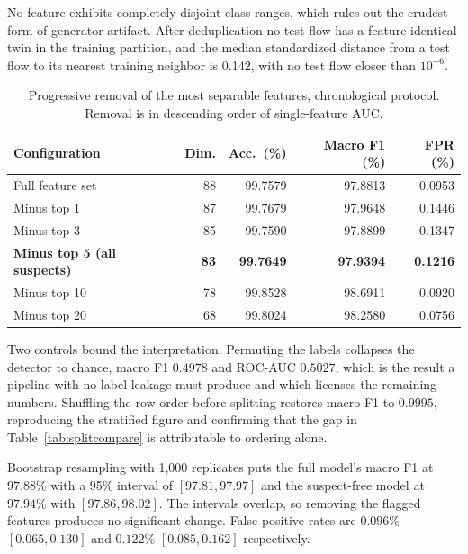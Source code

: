 \documentclass{ieeeaccess}
\begin{document}
No feature exhibits completely disjoint class ranges, which rules out the crudest form of generator artifact. After deduplication no test flow has a feature-identical twin in the training partition, and the median standardized distance from a test flow to its nearest training neighbor is 0.142, with no test flow closer than $10^{-6}$.

\begin{table}[!t]
\caption{Progressive removal of the most separable features, chronological protocol. Removal is in descending order of single-feature AUC.}
\centering
\label{tab:removal}
\footnotesize
\setlength{\tabcolsep}{4pt}
\renewcommand{\arraystretch}{1.2}
\begin{tabular}{@{}lrrrr@{}}
\toprule
\textbf{Configuration} & \textbf{Dim.} & \textbf{Acc.\ (\%)} & \textbf{Macro F1 (\%)} & \textbf{FPR (\%)} \\
\midrule
Full feature set        & 88 & 99.7579 & 97.8813 & 0.0953 \\
Minus top 1             & 87 & 99.7679 & 97.9648 & 0.1446 \\
Minus top 3             & 85 & 99.7590 & 97.8899 & 0.1347 \\
\textbf{Minus top 5 (all suspects)} & \textbf{83} & \textbf{99.7649} & \textbf{97.9394} & \textbf{0.1216} \\
Minus top 10            & 78 & 99.8528 & 98.6911 & 0.0920 \\
Minus top 20            & 68 & 99.8024 & 98.2580 & 0.0756 \\
\bottomrule
\end{tabular}
\end{table}

Two controls bound the interpretation. Permuting the labels collapses the
detector to chance, macro F1 $0.4978$ and ROC-AUC $0.5027$, which is the result a
pipeline with no label leakage must produce and which licenses the remaining
numbers. Shuffling the row order before splitting restores macro F1 to
$0.9995$, reproducing the stratified figure and confirming that the gap in
Table~\ref{tab:splitcompare} is attributable to ordering alone.

Bootstrap resampling with 1{,}000 replicates puts the full model's macro F1 at
$97.88\%$ with a 95\% interval of $[97.81, 97.97]$ and the suspect-free model at
$97.94\%$ with $[97.86, 98.02]$. The intervals overlap, so removing the flagged
features produces no significant change. False positive rates are
$0.096\%$ $[0.065, 0.130]$ and $0.122\%$ $[0.085, 0.162]$ respectively.
\end{document}
